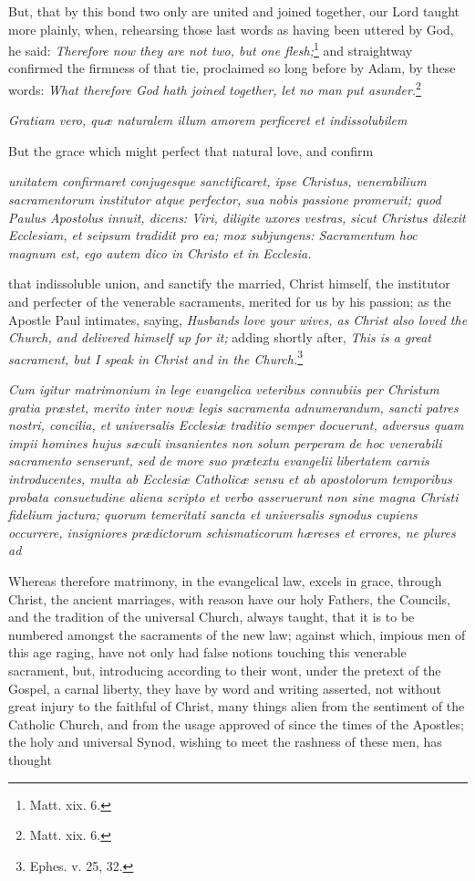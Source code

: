 But, that by this bond two only are united and joined together, our Lord taught more plainly, when, rehearsing those last words as having been uttered by God, he said: \emph{Therefore now they are not two, but one flesh;}\footnote{\par   Matt. xix. 6.} and straightway confirmed the firmness of that tie, proclaimed so long before by Adam, by these words: \emph{What therefore God hath joined together, let no man put asunder.}\footnote{\par   Matt. xix. 6.}

\emph{Gratiam vero, quæ naturalem illum amorem perficeret et indissolubilem }

But the grace which might perfect that natural love, and confirm

\emph{unitatem confirmaret conjugesque sanctificaret, ipse Christus, venerabilium sacramentorum institutor atque perfector, sua nobis passione promeruit; quod Paulus Apostolus innuit, dicens: Viri, diligite uxores vestras, sicut Christus dilexit Ecclesiam, et seipsum tradidit pro ea; mox subjungens: Sacramentum hoc magnum est, ego autem dico in Christo et in Ecclesia.}

that indissoluble union, and sanctify the married, Christ himself, the institutor and perfecter of the venerable sacraments, merited for us by his passion; as the Apostle Paul intimates, saying, \emph{Husbands love your wives, as Christ also loved the Church, and delivered himself up for it;} adding shortly after, \emph{This is a great sacrament, but I speak in Christ and in the Church.}\footnote{\par  Ephes. v. 25, 32.}

\emph{Cum igitur matrimonium in lege evangelica veteribus connubiis per Christum gratia præstet, merito inter novæ legis sacramenta adnumerandum, sancti patres nostri, concilia, et universalis Ecclesiæ traditio semper docuerunt, adversus quam impii homines hujus sæculi insanientes non solum perperam de hoc venerabili sacramento senserunt, sed de more suo prætextu evangelii libertatem carnis introducentes, multa ab Ecclesiæ Catholicæ sensu et ab apostolorum temporibus probata consuetudine aliena scripto et verbo asseruerunt non sine magna Christi fidelium jactura; quorum temeritati sancta et universalis synodus cupiens occurrere, insigniores prædictorum schismaticorum hæreses et errores, ne plures ad }

Whereas therefore matrimony, in the evangelical law, excels in grace, through Christ, the ancient marriages, with reason have our holy Fathers, the Councils, and the tradition of the universal Church, always taught, that it is to be numbered amongst the sacraments of the new law; against which, impious men of this age raging, have not only had false notions touching this venerable sacrament, but, introducing according to their wont, under the pretext of the Gospel, a carnal liberty, they have by word and writing asserted, not without great injury to the faithful of Christ, many things alien from the sentiment of the Catholic Church, and from the usage approved of since the times of the Apostles; the holy and universal Synod, wishing to meet the rashness of these men, has thought

